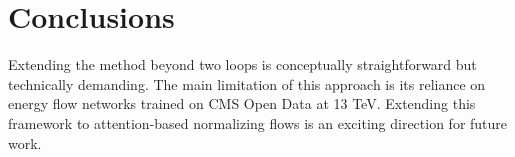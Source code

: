 \section{Conclusions}\label{sec:conclusions}

Extending the method beyond two loops is conceptually straightforward
but technically demanding. The main limitation of this approach is its
reliance on energy flow networks trained on CMS Open Data at 13 TeV.
Extending this framework to attention-based normalizing flows is an
exciting direction for future work.

